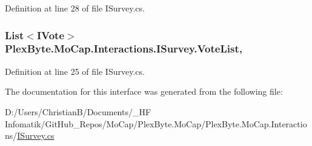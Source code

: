 Definition at line 28 of file I\+Survey.\+cs.

\subsubsection[{\texorpdfstring{Vote\+List}{VoteList}}]{\setlength{\rightskip}{0pt plus 5cm}List$<${\bf I\+Vote}$>$ Plex\+Byte.\+Mo\+Cap.\+Interactions.\+I\+Survey.\+Vote\+List\hspace{0.3cm}{\ttfamily [get]}, {\ttfamily [set]}}\hypertarget{interface_plex_byte_1_1_mo_cap_1_1_interactions_1_1_i_survey_a86a110a0d3506ced724e5246fb3596ad}{}\label{interface_plex_byte_1_1_mo_cap_1_1_interactions_1_1_i_survey_a86a110a0d3506ced724e5246fb3596ad}


Definition at line 25 of file I\+Survey.\+cs.



The documentation for this interface was generated from the following file\+:\begin{DoxyCompactItemize}
\item 
D\+:/\+Users/\+Christian\+B/\+Documents/\+\_\+\+H\+F Infomatik/\+Git\+Hub\+\_\+\+Repos/\+Mo\+Cap/\+Plex\+Byte.\+Mo\+Cap/\+Plex\+Byte.\+Mo\+Cap.\+Interactions/\hyperlink{_i_survey_8cs}{I\+Survey.\+cs}\end{DoxyCompactItemize}
